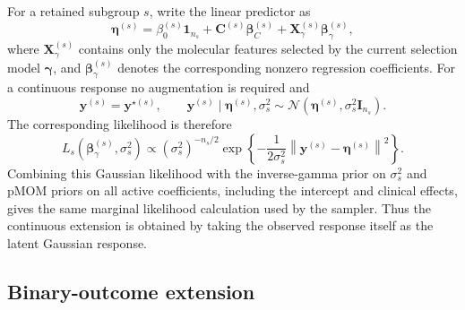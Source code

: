 \documentclass[article]{jss}
\begin{document}
For a retained subgroup $s$, write the linear predictor as
%
\begin{equation}\label{eq:eta-continuous}
  \bm{\eta}^{(s)}
  = \beta_0^{(s)}\bm{1}_{n_s}
  + \bm{C}^{(s)}\bm{\beta}_{C}^{(s)}
  + \bm{X}_{\gamma}^{(s)}\bm{\beta}_{\gamma}^{(s)},
\end{equation}
%
where $\bm{X}_{\gamma}^{(s)}$ contains only the molecular features selected by
the current selection model $\bm{\gamma}$, and
$\bm{\beta}_{\gamma}^{(s)}$ denotes the corresponding nonzero regression
coefficients.  For a continuous response no augmentation is required and
%
\begin{equation}\label{eq:continuous-model}
  \bm{y}^{(s)}=\bm{y}^{\star(s)}, \qquad
  \bm{y}^{(s)}\mid\bm{\eta}^{(s)},\sigma_s^2
  \sim \mathcal{N}\!\left(\bm{\eta}^{(s)},\sigma_s^2\bm{I}_{n_s}\right).
\end{equation}
%
The corresponding likelihood is therefore
%
\begin{equation}\label{eq:continuous-likelihood}
  L_s(\bm{\beta}_{\gamma}^{(s)},\sigma_s^2)
  \propto (\sigma_s^2)^{-n_s/2}
  \exp\!\left\{
    -\frac{1}{2\sigma_s^2}
    \left\|\bm{y}^{(s)}-\bm{\eta}^{(s)}\right\|^2
  \right\}.
\end{equation}
%
Combining this Gaussian likelihood with the inverse-gamma prior on
$\sigma_s^2$ and pMOM priors on all active coefficients, including the
intercept and clinical effects, gives the same marginal
likelihood calculation used by the sampler.  Thus the continuous extension is
obtained by taking the observed response itself as the latent Gaussian
response.

\subsection{Binary-outcome extension}\label{sec:appendix-binary}
\end{document}
